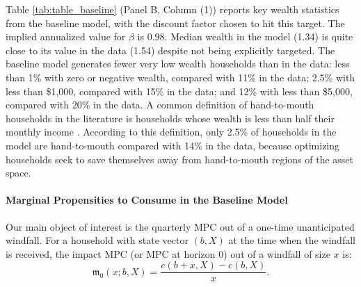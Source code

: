\begin{table}[ht]
\label{tab:table_baseline}

\end{table}

%

Table \ref{tab:table_baseline} (Panel B, Column (1)) reports key wealth statistics from the baseline model, with the discount factor chosen to hit this target. The implied annualized value for $\beta$ is $0.98$. Median wealth in the model (1.34) is quite close to its value in the  data (1.54) despite not being explicitly targeted. The baseline model generates fewer very low wealth households than in the data: less than 1\% with zero or negative wealth, compared with 11\% in the data; 2.5\% with less than \$1,000, compared with 15\% in the data; and 12\% with less than \$5,000, compared with 20\% in the data. A common definition of hand-to-mouth households in the literature is households whose wealth is less than half their monthly income \citet{kaplan2014wealthy}. According to this definition, only 2.5\% of households in the model are hand-to-mouth compared with 14\% in the data, because optimizing households seek to save themselves away from hand-to-mouth regions of the asset space. 


\paragraph{Marginal Propensities to Consume in the Baseline Model}
Our main object of interest is the quarterly MPC out of a one-time unanticipated windfall. For a household with state vector $\left( b,X\right)$ at the time when the windfall is received, the impact MPC (or MPC at horizon $0$) out of a windfall of size $x$ is: 
\begin{equation}
\mathfrak{m}_{0}\left(x;b,X\right) =\frac{c\left( b+x,X\right) -c\left( b,X\right) }{x}.
\label{eq:impactMPC_discrete}
\end{equation}

